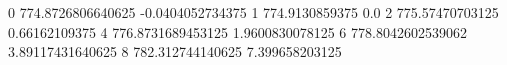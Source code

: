 0 774.8726806640625 -0.0404052734375
1 774.9130859375 0.0
2 775.57470703125 0.66162109375
4 776.8731689453125 1.9600830078125
6 778.8042602539062 3.89117431640625
8 782.312744140625 7.399658203125
